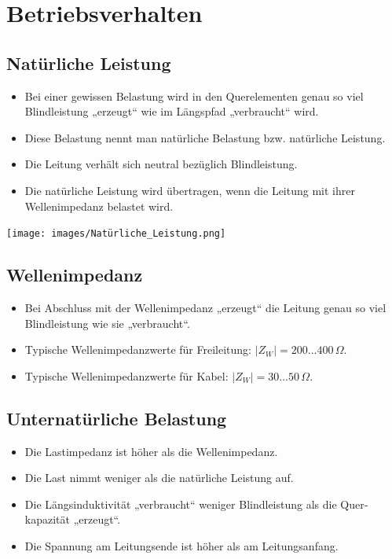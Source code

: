 \section{Betriebsverhalten}


\subsection{Natürliche Leistung}

\begin{itemize}
    \item Bei einer gewissen Belastung wird in den Querelementen genau so viel Blindleistung „erzeugt“ wie im Längspfad „verbraucht“ wird.
    \item Diese Belastung nennt man natürliche Belastung bzw. natürliche Leistung.
    \item Die Leitung verhält sich neutral bezüglich Blindleistung.
    \item Die natürliche Leistung wird übertragen, wenn die Leitung mit ihrer Wellenimpedanz belastet wird.
\end{itemize}

\vspace{0.15cm}

\texttt{[image: images/Natürliche\_Leistung.png]}


\subsection{Wellenimpedanz}

\begin{itemize}
    \item Bei Abschluss mit der Wellenimpedanz „erzeugt“ die Leitung genau so viel Blindleistung wie sie „verbraucht“.
    \item Typische Wellenimpedanzwerte für Freileitung: \( |\!Z_W\!| = 200 \ldots 400\,\Omega \).
    \item Typische Wellenimpedanzwerte für Kabel: \( |\!Z_W\!| = 30 \ldots 50\,\Omega \).
\end{itemize}


\subsection{Unternatürliche Belastung}

\begin{itemize}
    \item Die Lastimpedanz ist höher als die Wellenimpedanz.
    \item Die Last nimmt weniger als die natürliche Leistung auf.
    \item Die Längsinduktivität „verbraucht“ weniger Blindleistung als die Quer­kapazität „erzeugt“.
    \item Die Spannung am Leitungsende ist höher als am Leitungsanfang.
\end{itemize}


